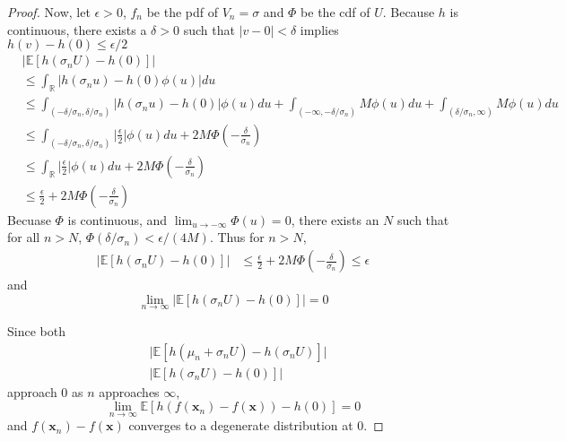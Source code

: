 \begin{proof}
    Now, let $\epsilon > 0$, $f_n$ be the pdf of $V_n = \sigma$ and $\Phi$ be the cdf of $U$.
    Because $h$ is continuous, there exists a $\delta > 0$ such that
    $ \lvert v - 0 \rvert < \delta $ implies $h(v) - h(0) \leq \epsilon / 2$
    \begin{align*}
        & \lvert \mathbb{E}[h(\sigma_n U) - h(0)] \rvert \\
        & \leq
        \int_{\mathbb{R}} \lvert h(\sigma_n u) - h(0) \phi(u) \lvert du \\
        & \leq
        \int_{(-\delta / \sigma_n, \delta / \sigma_n)} \lvert h(\sigma_n u) - h(0) \rvert \phi(u) du
        + \int_{(-\infty, -\delta / \sigma_n)}
        M \phi(u) du + \int_{(\delta / \sigma_n, \infty)} M \phi(u) du \\
        & \leq \int_{(-\delta / \sigma_n, \delta / \sigma_n)} \lvert \frac{\epsilon}2\rvert \phi(u) du + 2M \Phi(-\frac{ \delta }{ \sigma_n }) \\
        & \leq \int_{\mathbb{R}} \lvert \frac{\epsilon}2\rvert \phi(u) du + 2M \Phi(-\frac{ \delta }{ \sigma_n }) \\
        & \leq \frac\epsilon2 + 2M \Phi(-\frac{ \delta }{ \sigma_n })
    \end{align*}
    Becuase $\Phi$ is continuous, and $\lim_{u \to -\infty}\Phi(u) = 0$, there exists an $N$ such that for all $n > N$, $\Phi(\delta/\sigma_n) < \epsilon / (4M)$.
    Thus for $n > N$,
    \begin{align*}
        \lvert \mathbb{E}[h(\sigma_n U) - h(0)] \rvert
        & \leq \frac\epsilon2
        + 2M \Phi(-\frac{ \delta }{ \sigma_n })
        \leq \epsilon
    \end{align*}
    and
    \begin{equation*}
        \lim_{n \to \infty} \lvert \mathbb{E}[h(\sigma_n U) - h(0)] \rvert = 0
    \end{equation*}

    Since both
    \begin{align*}
        & \lvert \mathbb{E}[h(\mu_n + \sigma_n U) - h(\sigma_n U)] \rvert \\
        & \lvert \mathbb{E}[h(\sigma_nU) - h(0)] \rvert
    \end{align*}
    approach 0 as $n$ approaches $\infty$,
    \begin{equation*}
        \lim_{n \to \infty}  \mathbb{E}[h(f(\mathbf{x}_n) - f(\mathbf{x})) - h(0)]  = 0
    \end{equation*}
    and
    $f(\mathbf{x}_n) - f(\mathbf{x})$ converges to a degenerate distribution at 0.
\end{proof}

